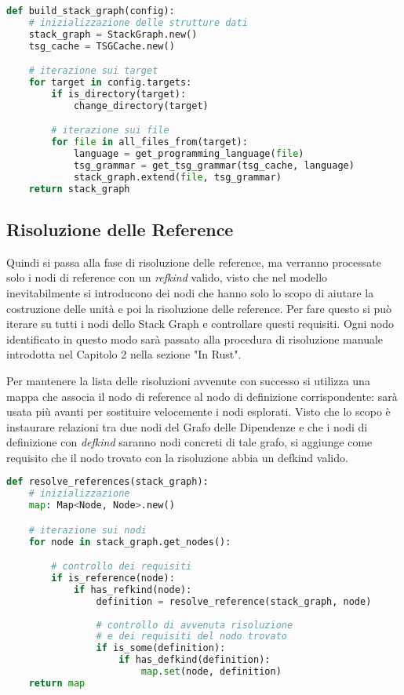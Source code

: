 \begin{lstlisting}[language=Python, caption=pseudocodice]
def build_stack_graph(config):
    # inizializzazione delle strutture dati
    stack_graph = StackGraph.new()
    tsg_cache = TSGCache.new()

    # iterazione sui target
    for target in config.targets:
        if is_directory(target):
            change_directory(target)

        # iterazione sui file
        for file in all_files_from(target):
            language = get_programming_language(file)
            tsg_grammar = get_tsg_grammar(tsg_cache, language)
            stack_graph.extend(file, tsg_grammar)
    return stack_graph
\end{lstlisting}

\subsection{Risoluzione delle Reference}

Quindi si passa alla fase di risoluzione delle reference, ma verranno processate solo i nodi di reference con un \emph{refkind} valido, visto che nel modello inevitabilmente si introducono dei nodi che hanno solo lo scopo di aiutare la costruzione delle unit\`a e poi la risoluzione delle reference.
Per fare questo si pu\`o iterare su tutti i nodi dello Stack Graph e controllare questi requisiti.
Ogni nodo identificato in questo modo sar\`a passato alla procedura di risoluzione manuale introdotta nel Capitolo 2 nella sezione "In Rust".

Per mantenere la lista delle risoluzioni avvenute con successo si utilizza una mappa che associa il nodo di reference al nodo di definizione corrispondente: sar\`a usata pi\`u avanti per sostituire velocemente i nodi esplorati.
Visto che lo scopo \`e instaurare relazioni tra due nodi del Grafo delle Dipendenze e che i nodi di definizione con \emph{defkind} saranno nodi concreti di tale grafo, si aggiunge come requisito che il nodo trovato con la risoluzione abbia un defkind valido.

\begin{lstlisting}[language=Python, caption=pseudocodice]
def resolve_references(stack_graph):
    # inizializzazione
    map: Map<Node, Node>.new()

    # iterazione sui nodi
    for node in stack_graph.get_nodes():

        # controllo dei requisiti
        if is_reference(node):
            if has_refkind(node):
                definition = resolve_reference(stack_graph, node)
                
                # controllo di avvenuta risoluzione
                # e dei requisiti del nodo trovato
                if is_some(definition):
                    if has_defkind(definition):
                        map.set(node, definition)
    return map
\end{lstlisting}

